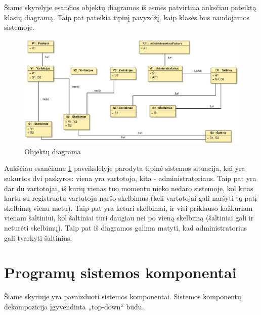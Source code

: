\documentclass[12pt]{article}
\begin{document}
	Šiame skyrelyje esančios objektų diagramos iš esmės patvirtina anksčiau pateiktą klasių diagramą. Taip pat pateikia tipinį pavyzdžį, kaip klasės bus naudojamos sistemoje.
	
	\begin{figure}[h]
		\begin{center}
			\includegraphics[width=\textwidth]{ObjektuDiagrama.eps}
			\caption{Objektų diagrama\label{ObjectDiagram}}
		\end{center}
	\end{figure}
	
	Aukščiau esančiame \ref{ObjectDiagram} paveikslėlyje parodyta tipinė sistemos situacija, kai yra sukurtos dvi paskyros: viena yra vartotojo, kita - administratoriaus. Taip pat yra dar du vartotojai, iš kurių vienas tuo momentu nieko nedaro sistemoje, kol kitas kartu su registruotu vartotoju naršo skelbimus (keli vartotojai gali naršyti tą patį skelbimą vienu metu). Taip pat yra keturi skelbimai, ir visi priklauso kažkuriam vienam šaltiniui, kol šaltiniai turi daugiau nei po vieną skelbimą (šaltiniai gali ir neturėti skelbimų). Taip pat iš diagramos galima matyti, kad administratorius gali tvarkyti šaltinius.
	\pagebreak
	
	\section{Programų sistemos komponentai}
	
	Šiame skyriuje yra pavaizduoti sistemos komponentai. Sistemos komponentų dekompozicija įgyvendinta „top-down“ būdu.	
	
\end{document}
